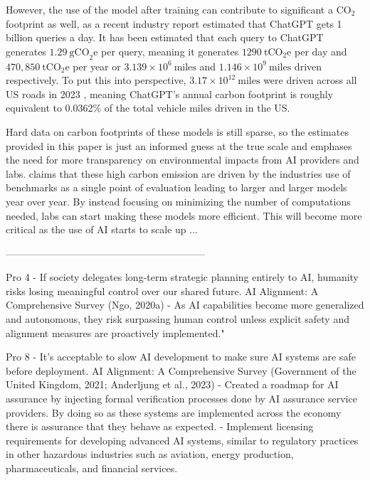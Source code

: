 However, the use of the model after training can contribute to significant a $\text{CO}_{2}$ footprint as well, as a recent industry report \citep{singh_chatgpt_2025} estimated that ChatGPT gets 1 billion queries a day. It has been estimated that each query to ChatGPT generates $1.29~\text{gCO}_{2}\text{e}$ per query, meaning it generates $1290~\text{tCO}_{2}\text{e}$ per day and $470,850~\text{tCO}_{2}\text{e}$ per year or $3.139 \times 10^{6}~\text{miles}$ and $1.146 \times 10^{9}~\text{miles}$ driven respectively. To put this into perspective, $3.17 \times 10^{12}~\text{miles}$ were driven across all US roads in 2023 \citep{statista_2023_vmt}, meaning ChatGPT's annual carbon footprint is roughly equivalent to 0.0362\% of the total vehicle miles driven in the US.

Hard data on carbon footprints of these models is still sparse, so the estimates provided in this paper is just an informed guess at the true scale and emphases the need for more transparency on environmental impacts from AI providers and labs. \cite{schwartz_green_2019} claims that these high carbon emission are driven by the industries use of benchmarks as a single point of evaluation leading to larger and larger models year over year. By instead focusing on minimizing the number of computations needed, labs can start making these models more efficient. This will become more critical as the use of AI starts to scale up ...

------------------------------------------------------------

Pro 4 - If society delegates long-term strategic planning entirely to AI, humanity risks losing meaningful control over our shared future.
AI Alignment: A Comprehensive Survey
(Ngo, 2020a)
\citep{ngo_agi_2020} - As AI capabilities become more generalized and autonomous, they risk surpassing human control unless explicit safety and alignment measures are proactively implemented."

Pro 8 - It's acceptable to slow AI development to make sure AI systems are safe before deployment.
AI Alignment: A Comprehensive Survey
(Government of the United Kingdom, 2021; Anderljung et al., 2023)
\citep{government_of_the_united_kingdom_roadmap_2021} - Created a roadmap for AI assurance by injecting formal verification processes done by AI assurance service providers. By doing so as these systems are implemented across the economy there is assurance that they behave as expected.
\citep{anderljung_frontier_2023} - Implement licensing requirements for developing advanced AI systems, similar to regulatory practices in other hazardous industries such as aviation, energy production, pharmaceuticals, and financial services.

